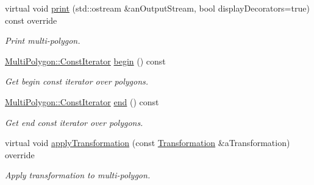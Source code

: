 \begin{DoxyCompactItemize}
virtual void \hyperlink{classostk_1_1math_1_1geom_1_1d2_1_1objects_1_1_multi_polygon_ab7a22decd4f9409b08e1b0e6b2bd60ef}{print} (std\+::ostream \&an\+Output\+Stream, bool display\+Decorators=true) const override
\begin{DoxyCompactList}\small\item\em Print multi-\/polygon. \end{DoxyCompactList}\item 
\hyperlink{classostk_1_1math_1_1geom_1_1d2_1_1objects_1_1_multi_polygon_ade3439a576f75f37a3ebf8b4e195bad5}{Multi\+Polygon\+::\+Const\+Iterator} \hyperlink{classostk_1_1math_1_1geom_1_1d2_1_1objects_1_1_multi_polygon_a5de8561a4153ff2565817ba6ab5ba7ca}{begin} () const
\begin{DoxyCompactList}\small\item\em Get begin const iterator over polygons. \end{DoxyCompactList}\item 
\hyperlink{classostk_1_1math_1_1geom_1_1d2_1_1objects_1_1_multi_polygon_ade3439a576f75f37a3ebf8b4e195bad5}{Multi\+Polygon\+::\+Const\+Iterator} \hyperlink{classostk_1_1math_1_1geom_1_1d2_1_1objects_1_1_multi_polygon_a05145ccf3b98e2800287a634bf98e2e6}{end} () const
\begin{DoxyCompactList}\small\item\em Get end const iterator over polygons. \end{DoxyCompactList}\item 
virtual void \hyperlink{classostk_1_1math_1_1geom_1_1d2_1_1objects_1_1_multi_polygon_a2dfac474c7787aac7ea0822e409bbff5}{apply\+Transformation} (const \hyperlink{classostk_1_1math_1_1geom_1_1d2_1_1_transformation}{Transformation} \&a\+Transformation) override
\begin{DoxyCompactList}\small\item\em Apply transformation to multi-\/polygon. \end{DoxyCompactList}\end{DoxyCompactItemize}
